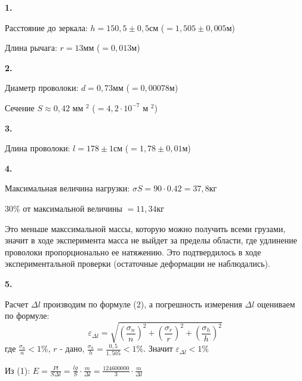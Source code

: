 \documentclass{article}
\begin{document}
\textbf{1.}

\noindent
Расстояние до зеркала: $h=150,5\pm 0,5$см ($=1,505\pm 0,005$м)

\noindent
Длина рычага: $r=13$мм ($=0,013$м)

\noindent
\textbf{2.}

\noindent
Диаметр проволоки: $d=0,73$мм ($=0,00078$м)

\noindent
Сечение $S\approx 0,42$ мм $^2$ ($=4,2\cdot10^{-7} $ м $^2$)

\noindent
\textbf{3.}

\noindent
Длина проволоки: $l=178\pm 1$см ($=1,78\pm 0,01$м)

\noindent
\textbf{4.}

\noindent
Максимальная величина нагрузки: $\sigma S=90\cdot0.42=37,8$кг

\noindent
$30\%$ от максимальной величины $=11,34$кг

\noindent
Это меньше макссимальной массы, которую можно получить всеми грузами, значит в ходе эксперимента масса не выйдет за пределы области, где удлинение проволоки пропорционально ее натяжению. Это подтвердилось в ходе экспериментальной проверки (остаточные деформации не наблюдались).

\noindent
\textbf{5.}

\noindent
Расчет $\Delta l$ производим по формуле (2), а погрешность измерения $\Delta l$ оцениваем по формуле: $$\varepsilon_{\Delta l} = \sqrt{(\frac{\sigma_n}{n})^2+(\frac{\sigma_r}{r})^2+(\frac{\sigma_h}{h})^2}$$ где $\frac{\sigma_n}{n}<1\%$, $r$ - дано, $\frac{\sigma_h}{h} = \frac{0,5}{1,505}<1\%$. Значит $\varepsilon_{\Delta l}<1\%$ 

\noindent
Из (1): $E=\frac{Pl}{S\Delta l} = \frac{lg}{S}\cdot\frac{m}{\Delta l} = \frac{124600000}{3}\cdot\frac{m}{\Delta l}$
\end{document}
